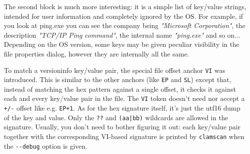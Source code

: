 \documentclass[a4paper,titlepage,12pt]{article}
\begin{document}
    The second block is much more interesting: it is a simple list of key/value
    strings, intended for user information and completely ignored by the OS.
    For example, if you look at ping.exe you can see the company being \emph{"Microsoft
    Corporation"}, the description \emph{"TCP/IP Ping command"}, the internal name
    \emph{"ping.exe"} and so on... Depending on the OS version, some keys may be given
    peculiar visibility in the file properties dialog, however they are internally
    all the same.

    To match a versioninfo key/value pair, the special file offset anchor \verb+VI+ was
    introduced.  This is similar to the other anchors (like \verb+EP+ and \verb+SL+)
    except that, instead of matching the hex pattern against a single offset, it checks
    it against each and every key/value pair in the file. The \verb+VI+ token doesn't
    need nor accept a \verb#+/-# offset like e.g. \verb#EP+1#. As for the hex signature
    itself, it's just the utf16 dump of the key and value. Only the \verb+??+ and
    \verb+(aa|bb)+ wildcards are allowed in the signature. Usually, you don't need to
    bother figuring it out: each key/value pair together with the corresponding VI-based
    signature is printed by \verb+clamscan+ when the \verb+--debug+ option is given.
\end{document}
